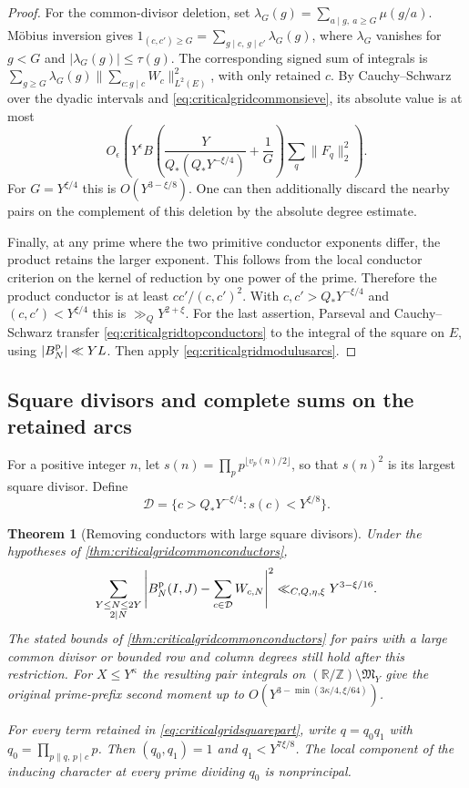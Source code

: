 \documentclass[11pt,a4paper]{article}
\numberwithin{equation}{section}
\newtheorem{theorem}{Theorem}[section]
\begin{document}
\begin{proof}
For the common-divisor deletion, set
$\lambda_G(g)=\sum_{a\mid g,\ a\ge G}\mu(g/a)$.
M\"obius inversion gives
$1_{(c,c')\ge G}=\sum_{g\mid c,\,g\mid c'}\lambda_G(g)$,
where $\lambda_G$ vanishes for $g<G$ and
$|\lambda_G(g)|\le\tau(g)$. The corresponding signed
sum of integrals is
$\sum_{g\ge G}\lambda_G(g)\|\sum_{c:g\mid c}W_c\|_{L^2(E)}^2$,
with only retained $c$. By Cauchy--Schwarz over the
dyadic intervals and \cref{eq:criticalgridcommonsieve},
its absolute value is at most
\[
 O_\epsilon\!\left(
 Y^\epsilon B
  \left(\frac{Y}{Q_*(Q_*Y^{-\xi/4})}+\frac1G\right)
     \sum_q\|F_q\|_2^2\right).
\]
For $G=Y^{\xi/4}$ this is $O(Y^{3-\xi/8})$.
One can then additionally discard the nearby pairs
on the complement of this deletion by the absolute
degree estimate.

Finally, at any prime where the two primitive conductor
exponents differ, the product retains the larger exponent.
This follows from the local conductor criterion on the
kernel of reduction by one power of the prime. Therefore
the product conductor is at least $cc'/(c,c')^2$.
With $c,c'>Q_*Y^{-\xi/4}$ and $(c,c')<Y^{\xi/4}$
this is $\gg_Q Y^{2+\xi}$.
For the last assertion, Parseval and Cauchy--Schwarz
transfer \cref{eq:criticalgridtopconductors} to the integral
of the square on $E$, using $|B_N^{\rm p}|\ll YL$.
Then apply \cref{eq:criticalgridmodulusarcs}.
\end{proof}

\clearpage
\subsection{Square divisors and complete sums on the retained arcs}

For a positive integer $n$, let $s(n)=\prod_p p^{\lfloor v_p(n)/2\rfloor}$,
so that $s(n)^2$ is its largest square divisor.
Define
\[
 \mathcal D=\{c>Q_*Y^{-\xi/4}:s(c)<Y^{\xi/8}\}.
\]

\begin{theorem}[Removing conductors with large square divisors]
\label{thm:criticalgridsquarepart}
Under the hypotheses of \cref{thm:criticalgridcommonconductors},
\begin{equation}
 \sum_{\substack{Y\le N\le2Y\\2\mid N}}
 \left|B_N^{\rm p}(I,J)-\sum_{c\in\mathcal D}W_{c,N}\right|^2
 \ll_{C,Q,\eta,\xi}Y^{3-\xi/16}.
 \label{eq:criticalgridsquarepart}
\end{equation}
The stated bounds of \cref{thm:criticalgridcommonconductors}
for pairs with a large common divisor or bounded row and column
degrees still hold after this restriction. For $X\le Y^\kappa$
the resulting pair integrals on $(\mathbb R/\mathbb Z)
\setminus\mathfrak M_Y$ give the original prime-prefix second
moment up to $O(Y^{3-\min(3\kappa/4,\xi/64)})$.

For every term retained in \cref{eq:criticalgridsquarepart},
write $q=q_0q_1$ with $q_0=\prod_{p\parallel q,\,p\mid c}p$.
Then $(q_0,q_1)=1$ and $q_1<Y^{7\xi/8}$.
The local component of the inducing character at every prime
dividing $q_0$ is nonprincipal.
\end{theorem}
\end{document}
